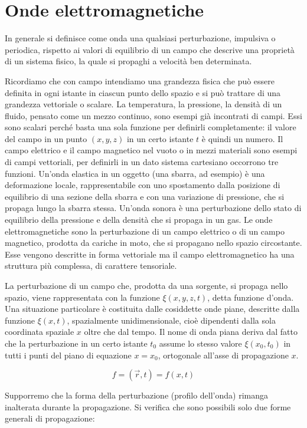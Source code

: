 \chapter{Onde elettromagnetiche}

In generale si definisce come onda una qualsiasi perturbazione, impulsiva o periodica, rispetto ai valori di equilibrio di un campo che descrive una proprietà di un sistema fisico, la quale si propaghi a velocità ben determinata.

Ricordiamo che con campo intendiamo una grandezza fisica che può essere definita in ogni istante in ciascun punto dello spazio e si può trattare di una grandezza vettoriale o scalare. La temperatura, la pressione, la densità di un fluido, pensato come un mezzo continuo, sono esempi già incontrati di campi. Essi sono scalari perché basta una sola funzione per definirli completamente: il valore del campo in un punto $(x,y,z)$ in un certo istante $t$ è quindi un numero. Il campo elettrico e il campo magnetico nel vuoto o in mezzi materiali sono esempi di campi vettoriali, per definirli in un dato sistema cartesiano occorrono tre funzioni. Un'onda elastica in un oggetto (una sbarra, ad esempio) è una deformazione locale, rappresentabile con uno spostamento dalla posizione di equilibrio di una sezione della sbarra e con una variazione di pressione, che si propaga lungo la sbarra stessa. Un'onda sonora è una perturbazione dello stato di equilibrio della pressione e della densità che si propaga in un gas. Le onde elettromagnetiche sono la perturbazione di un campo elettrico o di un campo magnetico, prodotta da cariche in moto, che si propagano nello spazio circostante. Esse vengono descritte in forma vettoriale ma il campo elettromagnetico ha una struttura più complessa, di carattere tensoriale.

La perturbazione di un campo che, prodotta da una sorgente, si propaga nello spazio, viene rappresentata con la funzione $\xi(x,y,z,t)$, detta funzione d'onda. Una situazione particolare è costituita dalle cosiddette onde piane, descritte dalla funzione $\xi(x,t)$, spazialmente unidimensionale, cioè dipendenti dalla sola coordinata spaziale $x$ oltre che dal tempo. Il nome di onda piana deriva dal fatto che la perturbazione in un certo istante $t_0$ assume lo stesso valore $\xi(x_0,t_0)$ in tutti i punti del piano di equazione $x=x_0$, ortogonale all'asse di propagazione $x$.

\[
	f=(\vec{r},t) = f(x,t)
\]

Supporremo che la forma della perturbazione (profilo dell'onda) rimanga inalterata durante la propagazione.
Si verifica che sono possibili solo due forme generali di propagazione:

